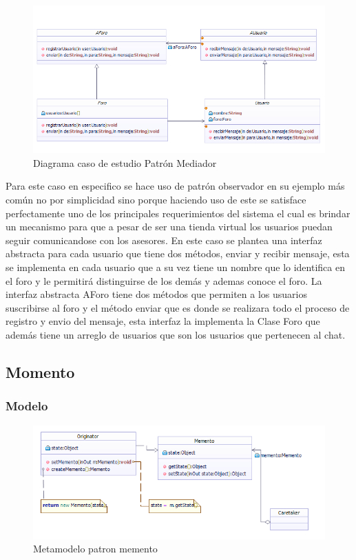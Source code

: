 \begin{figure}[th!]
	\centering
	\includegraphics[width=1\linewidth]{arquitectura/imagenes/DiagramaMediator}
	\caption{Diagrama caso de estudio Patrón Mediador}
\end{figure}

Para este caso en especifico se hace uso de patrón observador en su ejemplo más común no por simplicidad sino porque haciendo uso de este se satisface perfectamente uno de los principales requerimientos del sistema el cual es brindar un mecanismo para que a pesar de ser una tienda virtual los usuarios puedan seguir comunicandose con los asesores. \newline
En este caso se plantea una interfaz abstracta para cada usuario que tiene dos métodos, enviar y recibir mensaje, esta se implementa en cada usuario que a su vez tiene un nombre que lo identifica en el foro y le permitirá distinguirse de los demás y ademas conoce el foro. La interfaz abstracta AForo tiene dos métodos que permiten a los usuarios suscribirse al foro y el método enviar que es donde se realizara todo el proceso de registro y envio del mensaje, esta interfaz la implementa la Clase Foro que además tiene un arreglo de usuarios que son los usuarios que pertenecen al chat.



\subsection{Momento}
\subsubsection{Modelo}
\begin{figure}[th!]
	\centering
	\includegraphics[width=0.9\linewidth]{arquitectura/imagenes/PatronMemento}
	\caption{Metamodelo patron memento}
	\label{fig:Metamodelo patron memento}
\end{figure}

